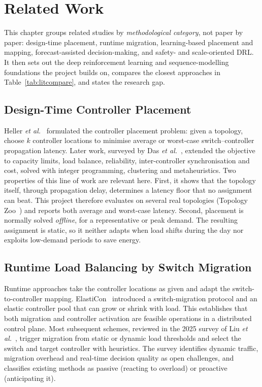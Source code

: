 \chapter{Related Work}
\label{ch:related}

This chapter groups related studies by \emph{methodological category}, not paper by paper: design-time placement, runtime migration, learning-based placement and mapping, forecast-assisted decision-making, and safety- and scale-oriented DRL. It then sets out the deep reinforcement learning and sequence-modelling foundations the project builds on, compares the closest approaches in Table~\ref{tab:litcompare}, and states the research gap.

\section{Design-Time Controller Placement}
\label{sec:rw-cpp}

Heller \emph{et al.}~\cite{heller2012cpp} formulated the controller placement problem: given a topology, choose $k$ controller locations to minimise average or worst-case switch--controller propagation latency. Later work, surveyed by Das \emph{et al.}~\cite{das2020survey}, extended the objective to capacity limits, load balance, reliability, inter-controller synchronisation and cost, solved with integer programming, clustering and metaheuristics. Two properties of this line of work are relevant here. First, it shows that the topology itself, through propagation delay, determines a latency floor that no assignment can beat. This project therefore evaluates on several real topologies (Topology Zoo~\cite{knight2011zoo}) and reports both average and worst-case latency. Second, placement is normally solved \emph{offline}, for a representative or peak demand. The resulting assignment is static, so it neither adapts when load shifts during the day nor exploits low-demand periods to save energy.

\section{Runtime Load Balancing by Switch Migration}
\label{sec:rw-migration}

Runtime approaches take the controller locations as given and adapt the switch-to-controller mapping. ElastiCon~\cite{dixit2013elasticon} introduced a switch-migration protocol and an elastic controller pool that can grow or shrink with load. This establishes that both migration and controller activation are feasible operations in a distributed control plane. Most subsequent schemes, reviewed in the 2025 survey of Liu \emph{et al.}~\cite{liu2025survey}, trigger migration from static or dynamic load thresholds and select the switch and target controller with heuristics. The survey identifies dynamic traffic, migration overhead and real-time decision quality as open challenges, and classifies existing methods as passive (reacting to overload) or proactive (anticipating it).


